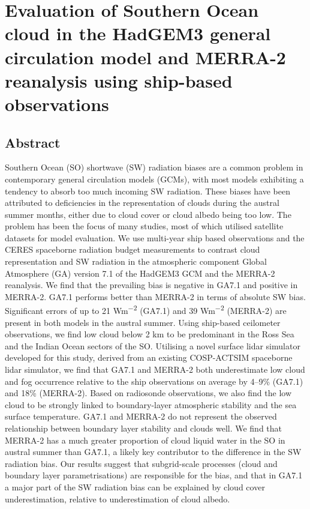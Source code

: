 \chapter{Evaluation of Southern Ocean cloud in the HadGEM3 general
circulation model and MERRA-2 reanalysis using ship-based
observations}

\section*{Abstract}

Southern Ocean (SO) shortwave (SW) radiation biases are a common problem in
contemporary general circulation models (GCMs), with most models exhibiting a
tendency to absorb too much incoming SW radiation. These biases have been
attributed to deficiencies in the representation of clouds during the austral
summer months, either due to cloud cover or cloud albedo being too low. The
problem has been the focus of many studies, most of which utilised satellite
datasets for model evaluation. We use multi-year ship based observations and
the CERES spaceborne radiation budget measurements to contrast cloud
representation and SW radiation in the atmospheric component Global Atmosphere
(GA) version 7.1 of the HadGEM3 GCM and the MERRA-2 reanalysis. We find that
the prevailing bias is negative in GA7.1 and positive in MERRA-2. GA7.1
performs better than MERRA-2 in terms of absolute SW bias. Significant errors
of up to 21 \unit{Wm^{-2}} (GA7.1) and 39 \unit{Wm^{-2}} (MERRA-2) are present
in both models in the austral summer. Using ship-based ceilometer observations,
we find low cloud below 2 \unit{km} to be predominant in the Ross Sea and the
Indian Ocean sectors of the SO. Utilising a novel surface lidar simulator
developed for this study, derived from an existing COSP-ACTSIM spaceborne lidar
simulator, we find that GA7.1 and MERRA-2 both underestimate low cloud and fog
occurrence relative to the ship observations on average by 4--9\% (GA7.1) and
18\% (MERRA-2). Based on radiosonde observations, we also find the low cloud
to be strongly linked to boundary-layer atmospheric stability and the sea
surface temperature. GA7.1 and MERRA-2 do not represent the observed
relationship between boundary layer stability and clouds well. We find that
MERRA-2 has a much greater proportion of cloud liquid water in the SO in
austral summer than GA7.1, a likely key contributor to the difference in the SW
radiation bias. Our results suggest that subgrid-scale processes (cloud and
boundary layer parametrisations) are responsible for the bias, and that in
GA7.1 a major part of the SW radiation bias can be explained by cloud cover
underestimation, relative to underestimation of cloud albedo.

